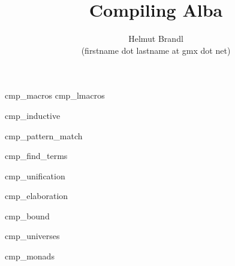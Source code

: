 \documentclass[10pt]{article}
\begin{document}


\title{
    Compiling Alba
}

\author{
    Helmut Brandl
    \\
    \scriptsize (firstname dot lastname at gmx dot net)
}
\date{}

\maketitle




\tableofcontents

 {cmp_macros}
 {cmp_lmacros}

\lstset{language=alba}


 {cmp_inductive}

 {cmp_pattern_match}

 {cmp_find_terms}

 {cmp_unification}

 {cmp_elaboration}

 {cmp_bound}

 {cmp_universes}

 {cmp_monads}
\end{document}
